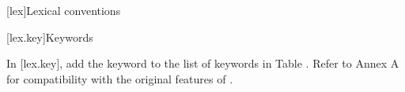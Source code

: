 
[lex]{Lexical conventions}

\setcounter{section}{11}
[lex.key]{Keywords}

\pnum
In {\cppstddocno} [lex.key], add the keyword  to the list of
keywords in Table . Refer to Annex A for compatibility with the original features of {\cppstddocno}.

